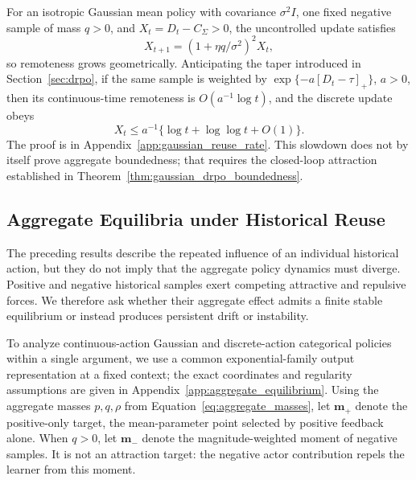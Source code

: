 \begin{proposition}
\label{prop:reuse_rate}
For an isotropic Gaussian mean policy with covariance \(\sigma^2I\),
one fixed negative sample of mass \(q>0\), and
\(X_t=D_t-C_\Sigma>0\), the uncontrolled update satisfies
\[
 X_{t+1}=\left(1+\eta q/\sigma^2\right)^2X_t,
\]
so remoteness grows geometrically. Anticipating the taper introduced in
Section~\ref{sec:drpo}, if the same sample is weighted by
\(\exp\{-a[D_t-\tau]_+\}\), \(a>0\), then its continuous-time
remoteness is \(O(a^{-1}\log t)\), and the discrete update obeys
\[
 X_t\le a^{-1}\{\log t+\log\log t+O(1)\}.
\]
The proof is in Appendix~\ref{app:gaussian_reuse_rate}. This slowdown
does not by itself prove aggregate boundedness; that requires the
closed-loop attraction established in
Theorem~\ref{thm:gaussian_drpo_boundedness}.
\end{proposition}

\subsection{Aggregate Equilibria under Historical Reuse}
\label{sec:aggregate_equilibria}

The preceding results describe the repeated influence of an individual
historical action, but they do not imply that the aggregate policy
dynamics must diverge. Positive and negative historical samples exert
competing attractive and repulsive forces. We therefore ask whether
their aggregate effect admits a finite stable equilibrium or instead
produces persistent drift or instability.

To analyze continuous-action Gaussian and discrete-action categorical
policies within a single argument, we use a common exponential-family
output representation at a fixed context; the exact coordinates and
regularity assumptions are given in
Appendix~\ref{app:aggregate_equilibrium}. Using the aggregate masses
\(p,q,\rho\) from Equation~\eqref{eq:aggregate_masses}, let
\(\mathbf m_+\) denote the positive-only target, the mean-parameter point
selected by positive feedback alone. When \(q>0\), let \(\mathbf m_-\)
denote the magnitude-weighted moment of negative samples. It is not an
attraction target: the negative actor contribution repels the learner from
this moment.

